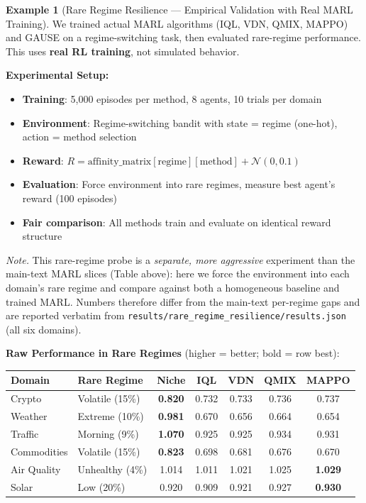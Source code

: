 \documentclass[11pt,a4paper]{article}
\theoremstyle{definition}
\newtheorem{example}{Example}[section]
\theoremstyle{plain}
\begin{document}
\begin{example}[Rare Regime Resilience --- Empirical Validation with Real MARL Training]
We trained actual MARL algorithms (IQL, VDN, QMIX, MAPPO) and GAUSE on a regime-switching task, then evaluated rare-regime performance. This uses \textbf{real RL training}, not simulated behavior.

\textbf{Experimental Setup:}
\begin{itemize}
    \item \textbf{Training}: 5,000 episodes per method, 8 agents, 10 trials per domain
    \item \textbf{Environment}: Regime-switching bandit with state = regime (one-hot), action = method selection
    \item \textbf{Reward}: $R = \text{affinity\_matrix}[\text{regime}][\text{method}] + \mathcal{N}(0, 0.1)$
    \item \textbf{Evaluation}: Force environment into rare regimes, measure best agent's reward (100 episodes)
    \item \textbf{Fair comparison}: All methods train and evaluate on identical reward structure
\end{itemize}

\emph{Note.} This rare-regime probe is a \emph{separate, more aggressive}
experiment than the main-text MARL slices (Table above): here we force the
environment into each domain's rare regime and compare against both a
homogeneous baseline and trained MARL. Numbers therefore differ from the
main-text per-regime gaps and are reported verbatim from
\texttt{results/rare\_regime\_resilience/results.json} (all six domains).

\textbf{Raw Performance in Rare Regimes} (higher = better; bold = row best):
\begin{center}
\begin{tabular}{llccccc}
\toprule
Domain & Rare Regime & Niche & IQL & VDN & QMIX & MAPPO \\
\midrule
Crypto & Volatile (15\%) & \textbf{0.820} & 0.732 & 0.733 & 0.736 & 0.737 \\
Weather & Extreme (10\%) & \textbf{0.981} & 0.670 & 0.656 & 0.664 & 0.654 \\
Traffic & Morning (9\%) & \textbf{1.070} & 0.925 & 0.925 & 0.934 & 0.931 \\
Commodities & Volatile (15\%) & \textbf{0.823} & 0.698 & 0.681 & 0.676 & 0.670 \\
Air Quality & Unhealthy (4\%) & 1.014 & 1.011 & 1.021 & 1.025 & \textbf{1.029} \\
Solar & Low (20\%) & 0.920 & 0.909 & 0.921 & 0.927 & \textbf{0.930} \\
\bottomrule
\end{tabular}
\end{center}


\end{example}
\end{document}
